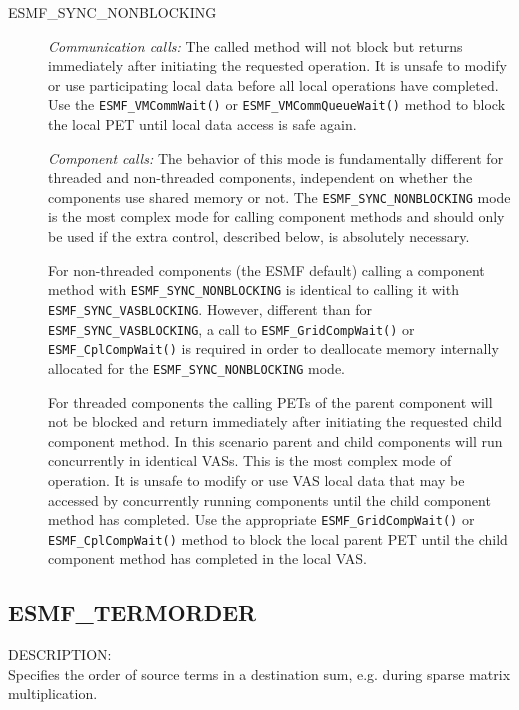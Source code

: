 \begin{description}
\item [ESMF\_SYNC\_NONBLOCKING]
         {\em Communication calls:} The called method will not block but 
         returns immediately after initiating the requested operation. It is
         unsafe to modify or use participating local data before all local
         operations have completed. Use the {\tt ESMF\_VMCommWait()} or
         {\tt ESMF\_VMCommQueueWait()} method to block the local PET until
         local data access is safe again. 

         {\em Component calls:} The behavior of this mode is fundamentally
         different for threaded and non-threaded components,
         independent on whether the components use shared memory or not.
         The {\tt ESMF\_SYNC\_NONBLOCKING} mode is the most complex mode for
         calling component methods and should only be used if the extra
         control, described below, is absolutely necessary.
         
\begin{sloppypar}
         For non-threaded components (the ESMF default)
         calling a component method with {\tt ESMF\_SYNC\_NONBLOCKING}
         is identical to calling it with {\tt ESMF\_SYNC\_VASBLOCKING}. However,
         different than for {\tt ESMF\_SYNC\_VASBLOCKING}, a call to
         {\tt ESMF\_GridCompWait()} or {\tt ESMF\_CplCompWait()} is
         required in order to deallocate memory internally allocated for the
         {\tt ESMF\_SYNC\_NONBLOCKING} mode.
\end{sloppypar}
         
         For threaded components the calling PETs
         of the parent component will not be blocked and return immediately
         after initiating the requested child component method. In this
         scenario parent and child components will run concurrently in
         identical VASs. This is the most complex mode of operation.
         It is unsafe to modify or use VAS local data that
         may be accessed by concurrently running components until the child
         component method has completed. Use the appropriate
         {\tt ESMF\_GridCompWait()} or {\tt ESMF\_CplCompWait()} method to
         block the local parent PET until the child component method has
         completed in the local VAS.
\end{description}


\subsection{ESMF\_TERMORDER}
\label{const:termorderflag}
{\sf DESCRIPTION:\\}  
Specifies the order of source terms in a destination sum, e.g. during sparse
matrix multiplication.

